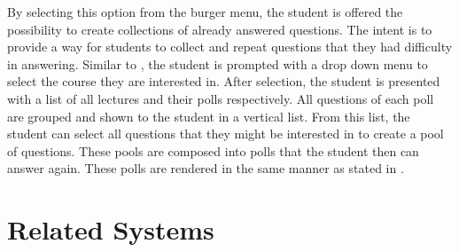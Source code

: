 By selecting this option from the burger menu, the student is offered the possibility to create collections of already answered questions. The intent is to provide a way for students to collect and repeat questions that they had difficulty in answering.
Similar to \todosct, the student is prompted with a drop down menu to select the course they are interested in. After selection, the student is presented with a list of all lectures and their polls respectively. All questions of each poll are grouped and shown to the student in a vertical list. From this list, the student can select all questions that they might be interested in to create a pool of questions.
These pools are composed into polls that the student then can answer again. These polls are rendered in the same manner as stated in \todosct.


\section{Related Systems}
